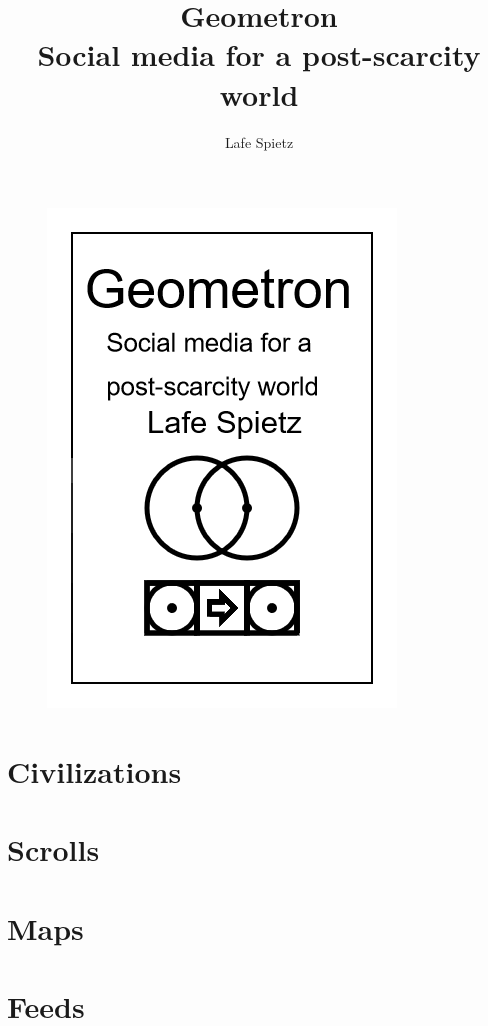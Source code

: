 \documentclass[ebook,12pt,openany,onesided]{memoir} %
\title{Geometron \\ Social media for a post-scarcity world}
\author{Lafe Spietz}
\begin{document}
\frontmatter
\begin{figure}[htbp]
\centering
\includegraphics{cover.png}
\end{figure}

\clearpage

\clearpage

\newpage
\thispagestyle{empty}
\mbox{}

\maketitle

\tableofcontents

\listoffigures 

%

\mainmatter

\chapter{Civilizations}

\chapter{Scrolls}

\chapter{Maps}

\chapter{Feeds}





\end{document}
